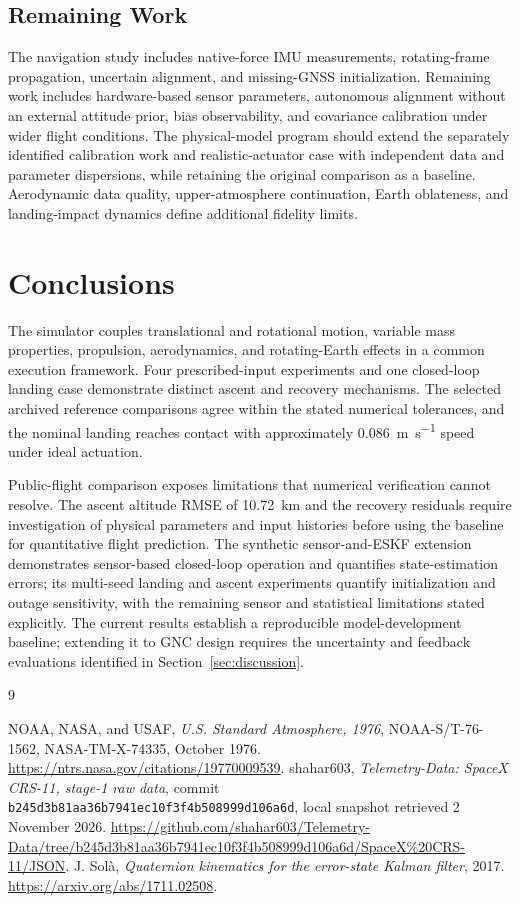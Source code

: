 \documentclass[11pt,letterpaper]{article}
\newcommand{\code}[1]{\texttt{#1}}
\begin{document}
\subsection{Remaining Work}
The navigation study includes native-force IMU measurements, rotating-frame propagation, uncertain alignment, and missing-GNSS initialization. Remaining work includes hardware-based sensor parameters, autonomous alignment without an external attitude prior, bias observability, and covariance calibration under wider flight conditions. The physical-model program should extend the separately identified calibration work and realistic-actuator case with independent data and parameter dispersions, while retaining the original comparison as a baseline. Aerodynamic data quality, upper-atmosphere continuation, Earth oblateness, and landing-impact dynamics define additional fidelity limits.

\section{Conclusions}
The simulator couples translational and rotational motion, variable mass properties, propulsion, aerodynamics, and rotating-Earth effects in a common execution framework. Four prescribed-input experiments and one closed-loop landing case demonstrate distinct ascent and recovery mechanisms. The selected archived reference comparisons agree within the stated numerical tolerances, and the nominal landing reaches contact with approximately \SI{0.086}{\metre\per\second} speed under ideal actuation.

Public-flight comparison exposes limitations that numerical verification cannot resolve. The ascent altitude RMSE of \SI{10.72}{\kilo\metre} and the recovery residuals require investigation of physical parameters and input histories before using the baseline for quantitative flight prediction. The synthetic sensor-and-ESKF extension demonstrates sensor-based closed-loop operation and quantifies state-estimation errors; its multi-seed landing and ascent experiments quantify initialization and outage sensitivity, with the remaining sensor and statistical limitations stated explicitly. The current results establish a reproducible model-development baseline; extending it to GNC design requires the uncertainty and feedback evaluations identified in Section~\ref{sec:discussion}.

\clearpage
\begin{thebibliography}{9}
\raggedright
{}
 NOAA, NASA, and USAF, \emph{U.S. Standard Atmosphere, 1976}, NOAA-S/T-76-1562, NASA-TM-X-74335, October 1976. \url{https://ntrs.nasa.gov/citations/19770009539}.
 shahar603, \emph{Telemetry-Data: SpaceX CRS-11, stage-1 raw data}, commit \code{b245d3b81aa36b7941ec10f3f4b508999d106a6d}, local snapshot retrieved 2 November 2026. \url{https://github.com/shahar603/Telemetry-Data/tree/b245d3b81aa36b7941ec10f3f4b508999d106a6d/SpaceX%20CRS-11/JSON}.
 J. Sol\`a, \emph{Quaternion kinematics for the error-state Kalman filter}, 2017. \url{https://arxiv.org/abs/1711.02508}.
\end{thebibliography}
\end{document}
